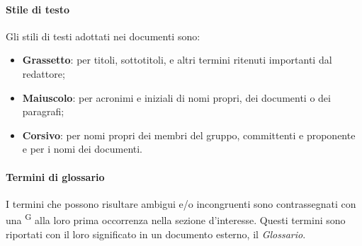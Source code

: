 \paragraph{Stile di testo}
Gli stili di testi adottati nei documenti sono:
\begin{itemize}
\item \textbf{Grassetto}: per titoli, sottotitoli, e altri termini ritenuti importanti dal redattore;
\item \textbf{Maiuscolo}: per acronimi e iniziali di nomi propri, dei documenti o dei paragrafi;
\item \textbf{Corsivo}: per nomi propri dei membri del gruppo, committenti e proponente e per i nomi dei documenti.
\end{itemize}


\paragraph{Termini di glossario}
I termini che possono risultare ambigui e/o incongruenti sono contrassegnati con una \textsuperscript{G} alla loro prima occorrenza nella sezione d’interesse. Questi termini sono riportati con il loro significato in un documento esterno, il \textit{Glossario}.

